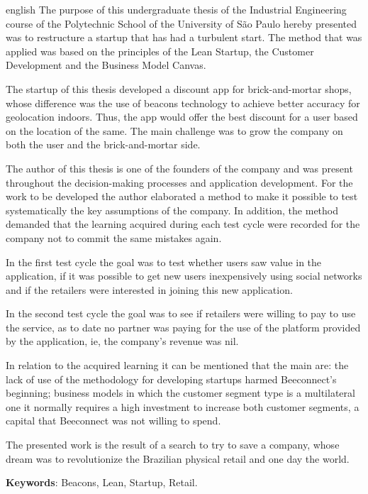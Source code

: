\setlength{\absparsep}{18pt} %
\begin{resumo}[Abstract]
 \begin{otherlanguage*}{english}
The purpose of this undergraduate thesis of the Industrial Engineering course of the Polytechnic School of the University of São Paulo hereby presented was to restructure a startup that has had a turbulent start. The method that was applied was based on the principles of the Lean Startup, the Customer Development and the Business Model Canvas.

The startup of this thesis developed a discount app for brick-and-mortar shops, whose difference was the use of beacons technology to achieve better accuracy for geolocation indoors. Thus, the app would offer the best discount for a user based on the location of the same. The main challenge was to grow the company on both the user and the brick-and-mortar side.

The author of this thesis is one of the founders of the company and was present throughout the decision-making processes and application development. For the work to be developed the author elaborated a method to make it possible to test systematically the key assumptions of the company. In addition, the method demanded that the learning acquired during each test cycle were recorded for the company not to commit the same mistakes again.

In the first test cycle the goal was to test whether users saw value in the application, if it was possible to get new users inexpensively using social networks and if the retailers were interested in joining this new application.

In the second test cycle the goal was to see if retailers were willing to pay to use the service, as to date no partner was paying for the use of the platform provided by the application, ie, the company's revenue was nil.

In relation to the acquired learning it can be mentioned that the main are: the lack of use of the methodology for developing startups harmed Beeconnect's beginning; business models in which the customer segment type is a multilateral one it normally requires a high investment to increase both customer segments, a capital that Beeconnect was not willing to spend.

The presented work is the result of a search to try to save a company, whose dream was to revolutionize the Brazilian physical retail and one day the world.

   \vspace{\onelineskip}
 
   \noindent 
   \textbf{Keywords}: Beacons, Lean, Startup, Retail.
 \end{otherlanguage*}
\end{resumo}
